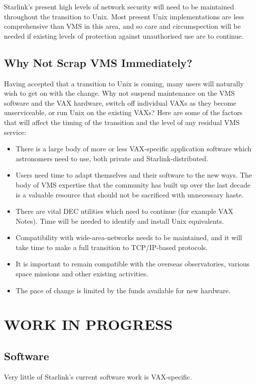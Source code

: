 Starlink's present high levels of network security will need to be
maintained throughout the transition to Unix.  Most present Unix
implementations are less comprehensive than VMS in this area, and so
care and circumspection will be needed if existing levels of protection
against unauthorised use are to continue.

\subsection{Why Not Scrap VMS Immediately?}
Having accepted that a transition to Unix is coming, many users will
naturally wish to get on with the change.  Why not suspend maintenance
on the VMS software and the VAX hardware, switch off individual VAXs as
they become unserviceable, or run Unix on the existing VAXs?  Here are
some of the factors that will affect the timing of the transition and
the level of any residual VMS service:
\begin{itemize}
\item There is a large body of more or less VAX-specific application
software which astronomers need to use, both private and
Starlink-distributed.
\item Users need time to adapt themselves and their software to the new
ways.  The body of VMS expertise that the community has built up over
the last decade is a valuable resource that should not be sacrificed
with unnecessary haste.
\item There are vital DEC utilities which need to continue (for example
VAX Notes).  Time will be needed to identify and install Unix
equivalents.
\item Compatibility with wide-area-networks needs to be maintained,
and it will take time to make a full transition to TCP/IP-based
protocols.
\item It is important to remain compatible with the overseas
observatories, various space missions and other existing activities.
\item The pace of change is limited by the funds available for new
hardware.
\end{itemize}

\section{WORK IN PROGRESS}
\subsection{Software}
Very little of Starlink's current software work is VAX-specific.

